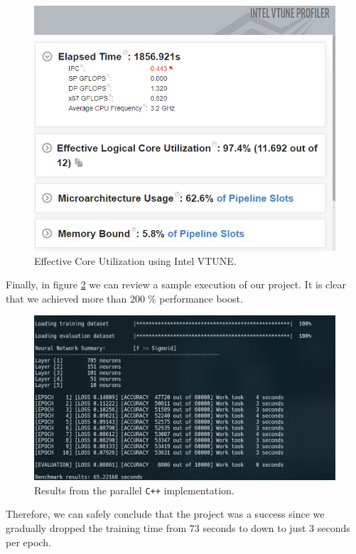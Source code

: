 \begin{figure}[!htbp]
\centering
\includegraphics[width=\linewidth]{static/figures/vtune.PNG}
\caption{Effective Core Utilization using Intel VTUNE.}
\label{fig:cpp-parallel-vtune}
\end{figure}

Finally, in figure \ref{fig:cpp-parallel} we can review a sample execution of our project. It is clear that we achieved more than $200 \; \%$ performance boost.

\begin{figure}[!htbp]
\centering
\includegraphics[width=\linewidth]{static/figures/cpp-parallel.PNG}
\caption{Results from the parallel \texttt{C++} implementation.}
\label{fig:cpp-parallel}
\end{figure}

Therefore, we can safely conclude that the project was a success since we gradually dropped the training time from $73$ seconds to down to just $3$ seconds per epoch.

